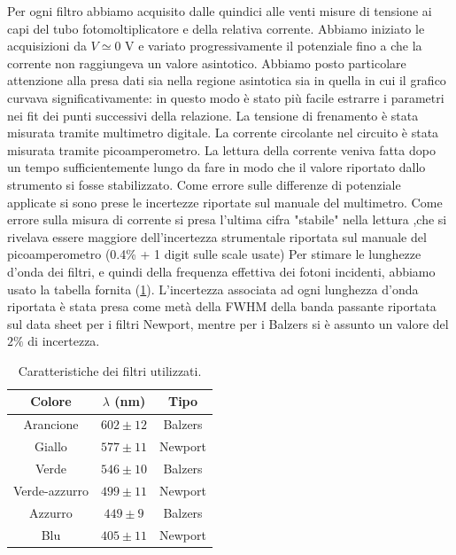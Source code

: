 \documentclass[10pt,a4paper]{article}
\begin{document}
Per ogni filtro abbiamo acquisito dalle quindici alle venti misure di tensione ai capi del tubo fotomoltiplicatore e della relativa corrente.
Abbiamo iniziato le acquisizioni da $V\simeq 0$ V e variato progressivamente il potenziale fino a che la corrente non raggiungeva un valore asintotico. Abbiamo posto particolare attenzione alla presa dati sia nella regione asintotica sia in quella in cui il grafico curvava significativamente: in questo modo è stato più facile estrarre i parametri nei fit dei punti successivi della relazione.
La tensione di frenamento è stata misurata tramite multimetro digitale. La corrente circolante nel circuito è stata misurata tramite picoamperometro.
La lettura della corrente veniva fatta dopo un tempo sufficientemente lungo da fare in modo che il valore riportato dallo strumento si fosse stabilizzato. %
Come errore sulle differenze di potenziale applicate si sono prese le incertezze riportate sul manuale del multimetro.
Come errore sulla misura di corrente si  presa l'ultima cifra "stabile" nella lettura ,che si rivelava essere maggiore dell'incertezza strumentale riportata sul manuale del picoamperometro (0.4\% + 1 digit sulle scale usate) %
Per stimare le lunghezze d'onda dei filtri, e quindi della frequenza effettiva dei fotoni incidenti, abbiamo usato la tabella fornita (\ref{tab:filtri}).
L'incertezza associata ad ogni lunghezza d'onda riportata è stata presa come metà della FWHM della banda passante riportata sul data sheet per i filtri Newport, mentre per i Balzers si è assunto un valore del $2\%$ di incertezza. 
 \begin{table}[!ht]
\begin{center}
\begin{tabular}{|c|c|c|}
\hline 
Colore & $\lambda$ (nm) & Tipo \\ 
\hline 
Arancione & $602\pm  12$  & Balzers\\ 
\hline 
Giallo & $577\pm 11$ & Newport\\ 
\hline 
Verde & $546\pm 10$ & Balzers\\ 
\hline 
Verde-azzurro & $499 \pm 11$ & Newport\\ 
\hline 
Azzurro & $ 449\pm 9$ & Balzers \\ 
\hline
Blu & $405\pm 11 $ & Newport\\ 
\hline
\end{tabular} 
\caption{Caratteristiche dei filtri utilizzati. \label{tab:filtri}}
\end{center}
\end{table}
\end{document}
